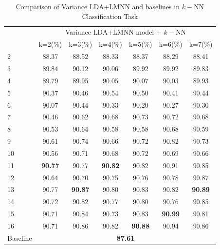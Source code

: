 \documentclass[conference]{IEEEtran}
\begin{document}
\begin{table}[htbp]
	\centering
 	\newcommand{\tabincell}[2]{\begin{tabular}{@{}#1@{}}#2\end{tabular}}
 	\renewcommand\arraystretch{1.0}
 	\caption{Comparison of Variance LDA+LMNN and baselines in $k-$NN Classification Task}
 	\label{base7}%
 		\begin{tabular}{@{}p{1cm}<{\centering}|c|c|c|c|c|c}
 		\hline
 		\multirow{2}{*}{\diagbox[height=2\line,width=1.42cm,font=\tiny]{$k$}{Acc.}{$\mathit{M}$}} &
 		\multicolumn{6}{c}{Variance LDA+LMNN model + $k-$NN}\\
 		\cline{2-7}
		    & {k=2(\%)} & {k=3(\%)} & {k=4(\%)} & {k=5(\%)} & {k=6(\%)} & {k=7(\%)}\\
 		\hline
 		2   &88.37  &88.52  &88.33  &88.37  &88.29  &88.41  \\
 		3   &89.84  &90.12  &90.06  &89.92  &89.92  &89.83  \\
 		4   &89.79  &89.95  &90.05  &90.07  &90.03  &89.93  \\
 		5   &90.37  &90.46  &90.54  &90.50  &90.41  &90.44  \\
 		6   &90.07  &90.44  &90.33  &90.20  &90.27  &90.30  \\
 		7   &90.46  &90.62  &90.68  &90.73  &90.72  &90.68  \\
 		8   &90.53  &90.64  &90.58  &90.58  &90.68  &90.59  \\
 		9   &90.61  &90.74  &90.66  &90.72  &90.82  &90.73  \\
 		10   &90.56  &90.71  &90.68  &90.72  &90.69  &90.66  \\
 		11   & \textbf{90.77} &90.77  & \textbf{90.82} &90.82  &90.91  &90.85  \\
 		12   &90.64  &90.70  &90.75  &90.76  &90.78  &90.87  \\
 		13   &90.77  & \textbf{90.87} &90.80  &90.83  &90.82  & \textbf{90.89} \\
 		14   &90.72  &90.82  &90.77  &90.80  &90.76  &90.85  \\
 		15   &90.71  &90.84  &90.73  &90.83  & \textbf{90.99} &90.81  \\
		16   &90.71  &90.86  &90.82  & \textbf{90.88} &90.94  &90.86  \\  
		\hline
		Baseline & \multicolumn{6}{c}{\textbf{87.61}} \\
 		\hline
 	\end{tabular}
\end{table}
\end{document}
